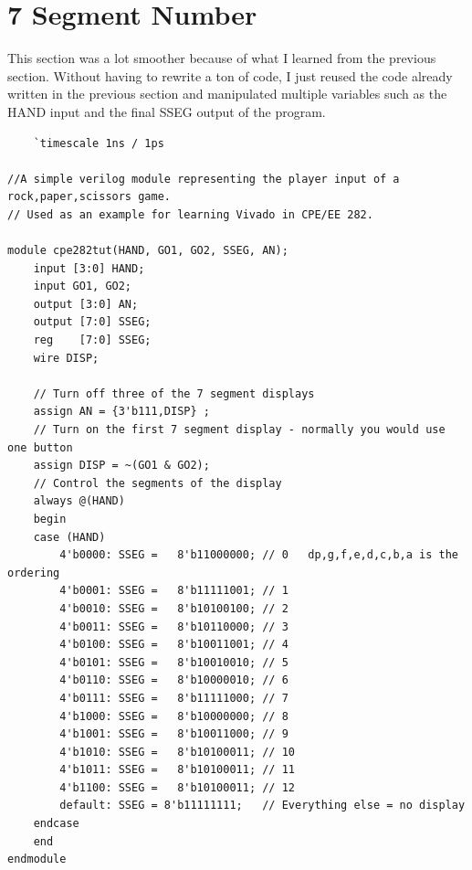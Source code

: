 \documentclass[11pt]{article}
\begin{document}
\section*{7 Segment Number}
This section was a lot smoother because of what I learned from the previous section. Without
having to rewrite a ton of code, I just reused the code already written in the previous section
and manipulated multiple variables such as the HAND input and the final SSEG output of the program.
\begin{verbatim}
    `timescale 1ns / 1ps

//A simple verilog module representing the player input of a rock,paper,scissors game.
// Used as an example for learning Vivado in CPE/EE 282.  

module cpe282tut(HAND, GO1, GO2, SSEG, AN);
    input [3:0] HAND;
    input GO1, GO2;
    output [3:0] AN;
    output [7:0] SSEG;
    reg    [7:0] SSEG;
    wire DISP;

    // Turn off three of the 7 segment displays
    assign AN = {3'b111,DISP} ;
    // Turn on the first 7 segment display - normally you would use one button
    assign DISP = ~(GO1 & GO2);
    // Control the segments of the display
    always @(HAND)
    begin
    case (HAND)
        4'b0000: SSEG =   8'b11000000; // 0   dp,g,f,e,d,c,b,a is the ordering
        4'b0001: SSEG =   8'b11111001; // 1
        4'b0010: SSEG =   8'b10100100; // 2
        4'b0011: SSEG =   8'b10110000; // 3
        4'b0100: SSEG =   8'b10011001; // 4
        4'b0101: SSEG =   8'b10010010; // 5
        4'b0110: SSEG =   8'b10000010; // 6
        4'b0111: SSEG =   8'b11111000; // 7
        4'b1000: SSEG =   8'b10000000; // 8
        4'b1001: SSEG =   8'b10011000; // 9
        4'b1010: SSEG =   8'b10100011; // 10
        4'b1011: SSEG =   8'b10100011; // 11
        4'b1100: SSEG =   8'b10100011; // 12
        default: SSEG = 8'b11111111;   // Everything else = no display
    endcase
    end
endmodule
\end{verbatim}
\end{document}

